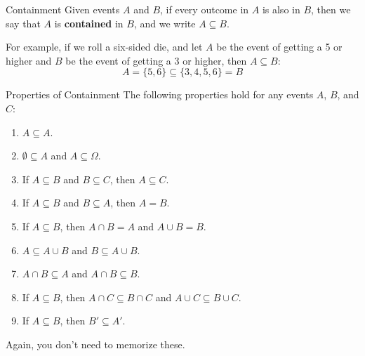 \documentclass[xcolor=table]{beamer}
\renewcommand{\emph}{\textbf}
\begin{document}
\begin{frame}{Containment}
Given events $A$ and $B$, if every outcome in $A$ is also in $B$, then we say that $A$ is \emph{contained} in $B$, and we write $A \subseteq B$.

\begin{figure}
\end{figure}

\pause For example, if we roll a six-sided die, and let $A$ be the event of getting a 5 or higher and $B$ be the event of getting a 3 or higher, then $A \subseteq B$:
$$A=\{5,6\} \subseteq \{3,4,5,6\} = B$$
\end{frame}

\begin{frame}{Properties of Containment}
The following properties hold for any events $A$, $B$, and $C$: \begin{enumerate}
\item $A \subseteq A$.
\item $\emptyset \subseteq A$ and $A \subseteq \Omega$.
\item If $A \subseteq B$ and $B \subseteq C$, then $A \subseteq C$.
\item If $A\subseteq B$ and $B\subseteq A$, then $A=B$.
\item If $A\subseteq B$, then $A \cap B = A$ and $A \cup B = B$.
\item $A \subseteq A \cup B$ and $B \subseteq A\cup B$.
\item $A\cap B \subseteq A$ and $A \cap B \subseteq B$.
\item If $A\subseteq B$, then $A\cap C \subseteq B \cap C$ and $A \cup C \subseteq B \cup C$.
\item If $A\subseteq B$, then $B' \subseteq A'$.
\end{enumerate}
Again, you don't need to memorize these.
\end{frame}
\end{document}
